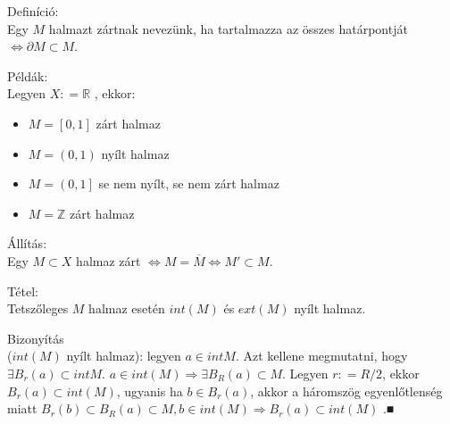 \documentclass[]{scrartcl}
\providecommand{\tightlist}{%
  \setlength{\itemsep}{0pt}\setlength{\parskip}{0pt}}
\newenvironment{definicio}{}{}
\newenvironment{tetel}{}{}
\newenvironment{bizonyitas}{}{}
\newenvironment{allitas}{}{}
\newenvironment{pelda}{}{}
\begin{document}
\begin{definicio}

Definíció:\\
Egy \(M\) halmazt zártnak nevezünk, ha tartalmazza az összes
határpontját \(\left. \Leftrightarrow\partial M \subset M \right.\).

\end{definicio}

\begin{pelda}

Példák:\\
Legyen \(X: = {\mathbb{R}}\) , ekkor:

\begin{itemize}
\tightlist
\item
  \(M = \left\lbrack 0,1 \right\rbrack\) zárt halmaz
\item
  \(M = \left( 0,1 \right)\) nyílt halmaz
\item
  \(M = \left( 0,1 \right\rbrack\) se nem nyílt, se nem zárt halmaz
\item
  \(M = {\mathbb{Z}}\) zárt halmaz
\end{itemize}

\end{pelda}

\begin{allitas}

Állítás:\\
Egy \(M \subset X\) halmaz zárt
\(\left. \Leftrightarrow M = \overline{M}\Leftrightarrow M' \subset M \right.\).

\end{allitas}

\begin{tetel}

Tétel:\\
Tetszőleges \(M\) halmaz esetén \({int}\left( M \right)\) és
\({ext}\left( M \right)\) nyílt halmaz.

\end{tetel}

\begin{bizonyitas}

Bizonyítás\\
(\({int}\left( M \right)\) nyílt halmaz): legyen \(a \in {int}M\). Azt
kellene megmutatni, hogy
\(\exists B_{r}\left( a \right) \subset {int}M\).
\(\left. a \in {int}\left( M \right)\Rightarrow\exists B_{R}\left( a \right) \subset M \right.\).
Legyen \(r: = R/2\), ekkor
\(B_{r}\left( a \right) \subset {int}\left( M \right)\), ugyanis ha
\(b \in B_{r}\left( a \right)\), akkor a háromszög egyenlőtlenség miatt
\(\left. B_{r}\left( b \right) \subset B_{R}\left( a \right) \subset M,b \in {int}\left( M \right)\Rightarrow B_{r}\left( a \right) \subset {int}\left( M \right) \right.\)
.■

\end{bizonyitas}
\end{document}
